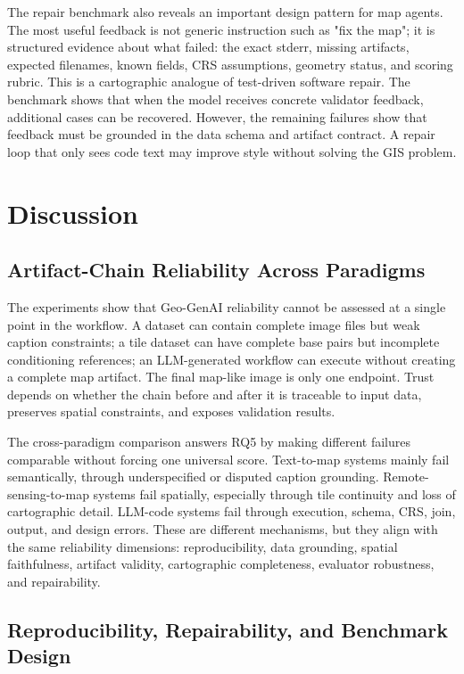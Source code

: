 \documentclass[]{interact}
\begin{document}
The repair benchmark also reveals an important design pattern for map agents. The most useful feedback is not generic instruction such as "fix the map"; it is structured evidence about what failed: the exact stderr, missing artifacts, expected filenames, known fields, CRS assumptions, geometry status, and scoring rubric. This is a cartographic analogue of test-driven software repair. The benchmark shows that when the model receives concrete validator feedback, additional cases can be recovered. However, the remaining failures show that feedback must be grounded in the data schema and artifact contract. A repair loop that only sees code text may improve style without solving the GIS problem.

\section{Discussion}

\subsection{Artifact-Chain Reliability Across Paradigms}

The experiments show that Geo-GenAI reliability cannot be assessed at a single point in the workflow. A dataset can contain complete image files but weak caption constraints; a tile dataset can have complete base pairs but incomplete conditioning references; an LLM-generated workflow can execute without creating a complete map artifact. The final map-like image is only one endpoint. Trust depends on whether the chain before and after it is traceable to input data, preserves spatial constraints, and exposes validation results.

The cross-paradigm comparison answers RQ5 by making different failures comparable without forcing one universal score. Text-to-map systems mainly fail semantically, through underspecified or disputed caption grounding. Remote-sensing-to-map systems fail spatially, especially through tile continuity and loss of cartographic detail. LLM-code systems fail through execution, schema, CRS, join, output, and design errors. These are different mechanisms, but they align with the same reliability dimensions: reproducibility, data grounding, spatial faithfulness, artifact validity, cartographic completeness, evaluator robustness, and repairability.

\subsection{Reproducibility, Repairability, and Benchmark Design}
\end{document}
